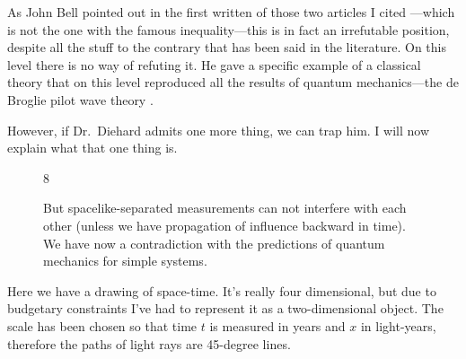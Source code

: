\documentclass[12pt,nofootinbib]{revtex4}
\begin{document}
As John Bell pointed out in the first written of those two articles I cited \cite{bell64physics195}---which is not the one with the famous inequality---this is in fact an irrefutable position, despite all the stuff to the contrary that has been said in the literature. On this level there is no way of refuting it. He gave a specific example of a classical theory that on this level reproduced all the results of quantum mechanics---the de Broglie pilot wave theory \cite{bohm52prb166}.

However, if Dr.\ Diehard admits one more thing, we can trap him. I will now explain what that one thing is.

\begin{figure}[htb] 
\begin{mdframed}
  \vspace{5pt}\hfill 8\\[-18pt]
  \begin{center}
  \end{center}
  \begin{raggedright}
    But spacelike-separated measurements can not interfere with each other (unless we have propagation of influence backward in time).\\[\baselineskip]

We have now a contradiction with the predictions of quantum mechanics for simple systems. 
  \end{raggedright}
  \vspace{6pt}
\end{mdframed}
\end{figure}

Here we have a drawing of space-time. It's really four dimensional, but due to budgetary constraints I've had to represent it as a two-dimensional object. The scale has been chosen so that time $t$ is measured in years and $x$ in light-years, therefore the paths of light rays are 45-degree lines.
\end{document}
